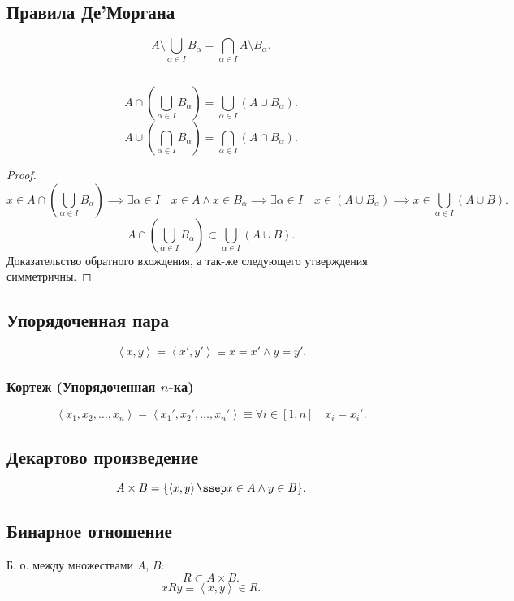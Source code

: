 \documentclass[11pt, oneside]{article}   	%
\begin{document}
    \subsection{Правила Де'Моргана}
        \[ A\setminus\bigcup\limits_{\alpha \in I}B_{\alpha} = \bigcap\limits_{\alpha \in I}A\setminus B_{\alpha}  .\]
    \subsection{}
        \begin{theorem}
            \[ A\cap\left( \bigcup\limits_{\alpha \in I}B_{\alpha} \right)=\bigcup\limits_{\alpha \in I}\left( A\cup B_{\alpha} \right)   .\] 
            \[ A\cup\left( \bigcap\limits_{\alpha \in I}B_{\alpha} \right) = \bigcap\limits_{\alpha \in I}\left( A\cap B_{\alpha} \right)   .\] 
            \begin{proof}
                \[x \in A\cap\left( \bigcup\limits_{\alpha \in I}B_{\alpha} \right) \implies \exists{\alpha \in I}\quad x \in A\land x \in B_{\alpha} \implies \exists{\alpha \in I}\quad x \in \left( A\cup B_{\alpha} \right) \implies x \in \bigcup\limits_{\alpha \in I}\left( A\cup B \right) .\]
                \[ A\cap\left( \bigcup\limits_{\alpha \in I}B_{\alpha} \right) \subset \bigcup\limits_{\alpha \in I}\left( A\cup B \right) .\] 
                Доказательство обратного вхождения, а так-же следующего утверждения симметричны. 
            \end{proof}
        \end{theorem}
    \subsection{Упорядоченная пара}
        \[ \left<x, y\right> = \left<x', y'\right> \equiv x=x' \land y=y' .\]
        \subsubsection{Кортеж (Упорядоченная $n$-ка)}
        \[ \left<x_1, x_2, \ldots, x_n\right> = \left<x_1', x_2', \ldots, x_n'\right> \equiv \forall{i \in [1, n]}\quad x_i = x_i' .\] 
    \subsection{Декартово произведение}
        \[ A\times B = \{\left<x, y\right> \ssep x \in A\land y \in B\}  .\] 
    \subsection{Бинарное отношение}
        Б. о. между множествами $A$,  $B$:
         \[ R \subset A\times B .\]
         \[ xRy \equiv \left<x, y\right> \in R .\]
\end{document}
